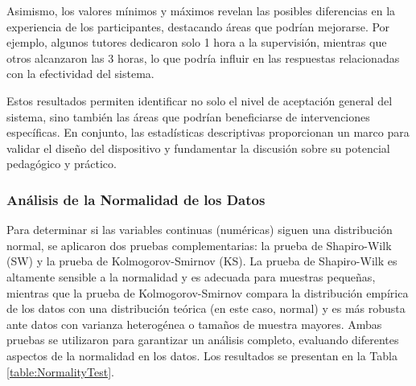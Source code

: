 \documentclass[a4paper,fleqn]{cas-sc}
\begin{document}
				Asimismo, los valores mínimos y máximos revelan las posibles diferencias en la experiencia de los participantes, destacando áreas que podrían mejorarse. Por ejemplo, algunos tutores dedicaron solo 1 hora a la supervisión, mientras que otros alcanzaron las 3 horas, lo que podría influir en las respuestas relacionadas con la efectividad del sistema.
				
				Estos resultados permiten identificar no solo el nivel de aceptación general del sistema, sino también las áreas que podrían beneficiarse de intervenciones específicas. En conjunto, las estadísticas descriptivas proporcionan un marco para validar el diseño del dispositivo y fundamentar la discusión sobre su potencial pedagógico y práctico.
				
				\subsubsection{Análisis de la Normalidad de los Datos}
					Para determinar si las variables continuas (numéricas) siguen una distribución normal, se aplicaron dos pruebas complementarias: la prueba de Shapiro-Wilk (SW) y la prueba de Kolmogorov-Smirnov (KS). La prueba de Shapiro-Wilk es altamente sensible a la normalidad y es adecuada para muestras pequeñas, mientras que la prueba de Kolmogorov-Smirnov compara la distribución empírica de los datos con una distribución teórica (en este caso, normal) y es más robusta ante datos con varianza heterogénea o tamaños de muestra mayores. Ambas pruebas se utilizaron para garantizar un análisis completo, evaluando diferentes aspectos de la normalidad en los datos. Los resultados se presentan en la Tabla \ref{table:NormalityTest}.
					
\end{document}
